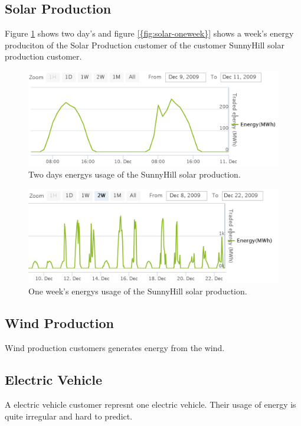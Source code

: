 \subsection{Solar Production}
Figure \ref{fig:solar-twoday} shows two day's and  figure \ref{{fig:solar-oneweek}} shows a week's energy produciton of the Solar Production customer of the customer SunnyHill solar production customer.

\begin{figure}[h!]
  \includegraphics[width=\linewidth]{sunnyhill-twoday.png}
  \caption{Two days energys usage of the SunnyHill solar production.}
  \label{fig:solar-twoday}
\end{figure}


\begin{figure}[h!]
  \includegraphics[width=\linewidth]{sunnyhill-oneweek.png}
  \caption{One week's energys usage of the SunnyHill solar production.}
  \label{fig:solar-oneweek}
\end{figure}

\subsection{Wind Production}
Wind production customers generates energy from the wind.
\subsection {Electric Vehicle}
A electric vehicle customer represnt one electric vehicle. Their usage of energy is quite irregular and hard to predict.

